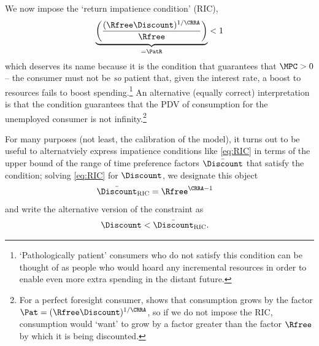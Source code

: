\documentclass{\handout}
\begin{document}
\indent We now impose the `return impatience condition' (RIC),
\begin{equation}\begin{gathered}\begin{aligned}
  \underbrace{\left(\frac{(\Rfree \Discount)^{1/\CRRA}}{\Rfree}\right)}_{= \PatR} < 1 \label{eq:RIC}
\end{aligned}\end{gathered}\end{equation}
which deserves its name because it is the condition that guarantees that $\MPCU
> 0$ -- the consumer must not be {\it so} patient that, given the interest rate, a boost to
resources fails to boost spending.\footnote{`Pathologically patient' consumers who do not satisfy this condition can be thought of as people who would hoard any incremental resources in order to enable even more extra spending in the distant future.}
An alternative (equally correct)
interpretation is that the condition guarantees that the PDV of
consumption for the unemployed consumer is not infinity.\footnote{For a perfect
foresight consumer,  shows that consumption grows by the factor
$\Pat = (\Rfree\Discount)^{1/\CRRA}$, so if we do not impose the RIC, consumption would `want' to grow by
a factor greater than the factor $\Rfree$ by which it is being
discounted.}  

For many purposes (not least, the calibration of the model), it turns out to be useful to alternatviely express
impatience conditions like \eqref{eq:RIC} in terms of the upper bound of the range of time preference
factors $\bar{\Discount}$ that satisfy the condition; solving \eqref{eq:RIC} for $\Discount$, we designate this 
object 
\begin{equation}\begin{gathered}\begin{aligned}
  \DiscountMaxRIC & =  \Rfree^{\CRRA-1}
\end{aligned}\end{gathered}\end{equation}
and write the alternative version of the constraint as 
\begin{equation}\begin{gathered}\begin{aligned}
  \Discount & <  \DiscountMaxRIC \label{eq:DiscountMaxRIC}.
\end{aligned}\end{gathered}\end{equation}
\end{document}
